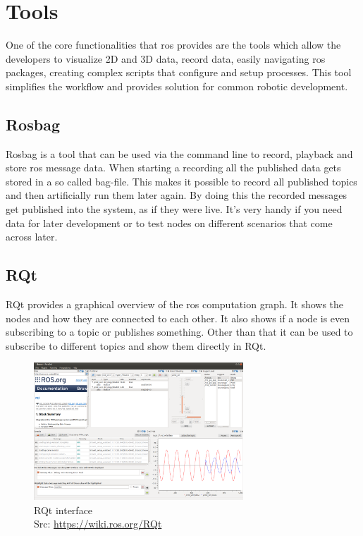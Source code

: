 \section{Tools}
One of the core functionalities that \gls{ros} provides are the tools which allow the developers to visualize 2D and 3D data, record data, easily navigating \gls{ros} packages, creating complex scripts that configure and setup processes. This tool simplifies the workflow and provides solution for common robotic development.

\subsection{Rosbag}
Rosbag is a tool that can be used via the command line to record, playback and store \gls{ros} message data. When starting a recording all the published data gets stored in a so called bag-file. This makes it possible to record all published topics and then artificially run them later again. By doing this the recorded messages get published into the system, as if they were live. It's very handy if you need data for later development or to test nodes on different scenarios that come across later.

\subsection{RQt}\label{rqt}
RQt provides a graphical overview of the \gls{ros} computation graph. It shows the nodes and how they are connected to each other. It also shows if a node is even subscribing to a topic or publishes something. Other than that it can be used to subscribe to different topics and show them directly in RQt.\newline
\begin{figure}[h]
	\centering
	\includegraphics[width=0.7\textwidth]{./media/images/RQt}
  	\caption{RQt interface\\Src: \url{https://wiki.ros.org/RQt}}
  	\label{rqtinterface}
\end{figure}

